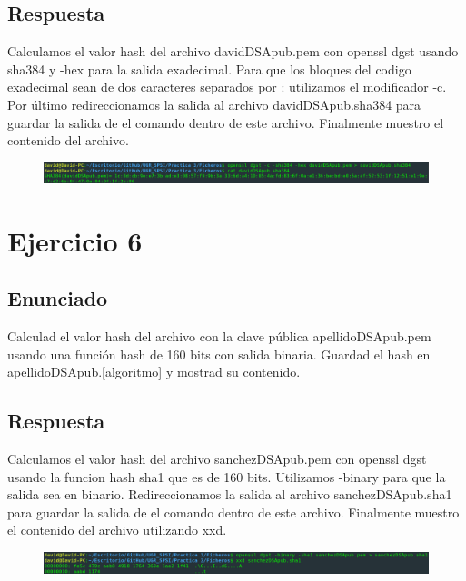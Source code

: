 \documentclass[10pt,a4paper,spanish]{report}
\begin{document}
\section{Respuesta}
\noindent
Calculamos el valor hash del archivo davidDSApub.pem con openssl dgst usando sha384 y -hex para la salida exadecimal. Para que los bloques del codigo exadecimal sean de dos caracteres separados por : utilizamos el modificador -c. Por último redireccionamos la salida al archivo davidDSApub.sha384 para guardar la salida de el comando dentro de este archivo. Finalmente muestro el contenido del archivo.

\begin{figure}[!hbp]
 \centering  \includegraphics[width=1\textwidth]{./Imagenes/5.png}
\end{figure}

\chapter{Ejercicio 6}

\section{Enunciado}
\noindent
Calculad el valor hash del archivo con la clave pública apellidoDSApub.pem usando una función hash de 160 bits con salida binaria. Guardad el hash en apellidoDSApub.[algoritmo] y mostrad su contenido.

\section{Respuesta}
\noindent
Calculamos el valor hash del archivo sanchezDSApub.pem con openssl dgst usando la funcion hash sha1 que es de 160 bits. Utilizamos -binary para que la salida sea en binario. Redireccionamos la salida al archivo sanchezDSApub.sha1 para guardar la salida de el comando dentro de este archivo. Finalmente muestro el contenido del archivo utilizando xxd.

\begin{figure}[!hbp]
 \centering  \includegraphics[width=1\textwidth]{./Imagenes/6.png}
\end{figure}
\end{document}
